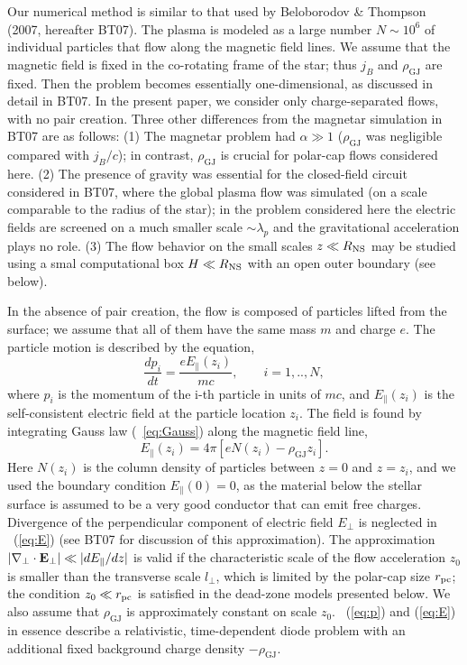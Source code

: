 Our numerical method is similar to that used by
   Beloborodov \& Thompson (2007, hereafter BT07).
The plasma is modeled as a large number $N\sim 10^6$ of individual
particles that flow along the magnetic field lines.
We assume that the magnetic field is fixed in
the co-rotating frame of the star; thus $j_B$ and $\rho_\mathrm{GJ}$ are fixed. Then the
problem becomes essentially one-dimensional, as discussed in detail in BT07.
In the present paper, we consider only charge-separated flows, with no pair creation.
Three other differences from the magnetar simulation in BT07 are as follows:
(1) The magnetar problem had $\alpha\gg 1$
($\rho_\mathrm{GJ}$ was negligible compared with $j_B/c$);
in contrast, $\rho_\mathrm{GJ}$ is crucial for polar-cap flows considered here.
(2) The presence of gravity was essential for the closed-field circuit considered
in BT07, where the global plasma flow was simulated (on a scale comparable to
the radius of the star); in the problem considered here the electric fields are
screened on a much smaller scale $\sim \lambda_p$ and the gravitational
acceleration plays no role.
(3) The flow behavior on the small scales $z\ll R_{\rm NS}$ may be studied using
a smal computational box $H\ll R_{\rm NS}$ with an open outer boundary (see below).

In the absence of pair creation, the flow is composed of particles lifted from
the surface; we assume that all of them have the same mass $m$ and charge $e$.
 The particle motion is described by the equation,
\begin{equation}
\label{eq:p}
    \frac{dp_i}{dt} = \frac{eE_\parallel(z_i)}{mc},   \qquad i=1,..,N,
\end{equation}
where $p_i$ is the momentum of the i-th particle in units of $mc$, and
$E_\parallel(z_i)$ is the self-consistent electric field at the particle location $z_i$.
The field is found by integrating Gauss law (\Eq~\ref{eq:Gauss})
along the magnetic field line,
\begin{equation}
 \label{eq:E}
   E_\parallel(z_i) = 4\pi \left[ eN(z_i) - \rho_\mathrm{GJ} z_i \right].
\end{equation}
Here $N(z_i)$ is the column density of particles between $z=0$ and $z=z_i$,
and we used the boundary condition $E_\parallel(0)=0$, as the material below the
stellar surface is assumed to be a very good conductor that can emit free charges.
Divergence of the perpendicular component of electric field $E_\perp$
is neglected in \Eq~(\ref{eq:E}) (see BT07 for discussion of this approximation).
The approximation $|\nabla_\perp\cdot{\mathbf E}_\perp|\ll |dE_\parallel/dz|$ is valid if the
characteristic scale of the flow acceleration $z_0$ is smaller than the transverse
scale $l_\perp$, which is limited by the polar-cap size $r_{\rm pc}$;
the condition $z_0\ll r_{\rm pc}$ is satisfied in the dead-zone models presented below.
We also assume that $\rho_\mathrm{GJ}$ is approximately constant on scale $z_0$.
\Eqs~(\ref{eq:p}) and (\ref{eq:E}) in essence describe a relativistic, time-dependent
diode problem with an additional fixed background charge density $-\rho_\mathrm{GJ}$.

